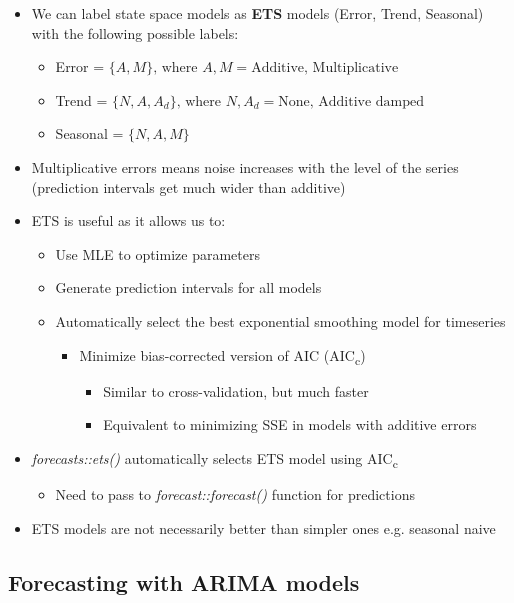 \documentclass{article}\usepackage[]{graphicx}\usepackage[]{color}
\begin{document}
\begin{itemize}
    \item We can label state space models as \textbf{ETS} models (Error, Trend, Seasonal) with the following possible labels:
    \begin{itemize}
        \item Error = $\{A, M\}\text{, where } A,M = \text{Additive, Multiplicative}$
        \item Trend = $\{N, A, A_d\} \text{, where } N, A_d = \text{None, Additive damped}$
        \item Seasonal = $\{N, A, M\}$
    \end{itemize}
    \item Multiplicative errors means noise increases with the level of the series (prediction intervals get much wider than additive)
    \item ETS is useful as it allows us to:
    \begin{itemize}
        \item Use MLE to optimize parameters
        \item Generate prediction intervals for all models
        \item Automatically select the best exponential smoothing model for timeseries
        \begin{itemize}
            \item Minimize bias-corrected version of AIC (AIC\textsubscript{c})
            \begin{itemize}
                \item Similar to cross-validation, but much faster
                \item Equivalent to minimizing SSE in models with additive errors
            \end{itemize}
        \end{itemize}
    \end{itemize}
    \item \textit{forecasts::ets()} automatically selects ETS model using AIC\textsubscript{c}
    \begin{itemize}
        \item Need to pass to \textit{forecast::forecast()} function for predictions
    \end{itemize}
    \item ETS models are not necessarily better than simpler ones e.g. seasonal naive
\end{itemize}

\subsection{Forecasting with ARIMA models}
\end{document}
